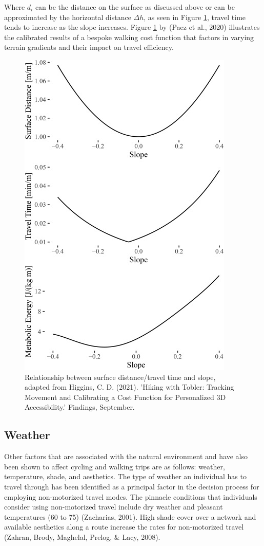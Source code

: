 \documentclass[
11pt, %
oneside, %
english, %
singlespacing, %
]{macthesis} %
\begin{document}
Where \(d_i\) can be the distance on the surface as discussed above or can be approximated by the horizontal distance \(\Delta h\), as seen in Figure \ref{fig:ch02-plot-fig-03}, travel time tends to increase as the slope increases. Figure \ref{fig:ch02-plot-fig-03} by (Paez et al., 2020) illustrates the calibrated results of a bespoke walking cost function that factors in varying terrain gradients and their impact on travel efficiency.

\begin{figure}

{\centering \includegraphics[width=0.5\linewidth]{figure/ch02-Fig-03} 

}

\caption{Relationship between surface distance/travel time and slope, adapted from Higgins, C. D. (2021). 'Hiking with Tobler: Tracking Movement and Calibrating a Cost Function for Personalized 3D Accessibility.' Findings, September.}\label{fig:ch02-plot-fig-03}
\end{figure}

\newpage

\subsection{Weather}\label{weather}

Other factors that are associated with the natural environment and have also been shown to affect cycling and walking trips are as follows: weather, temperature, shade, and aesthetics. The type of weather an individual has to travel through has been identified as a principal factor in the decision process for employing non-motorized travel modes. The pinnacle conditions that individuals consider using non-motorized travel include dry weather and pleasant temperatures (60 to 75) (Zacharias, 2001). High shade cover over a network and available aesthetics along a route increase the rates for non-motorized travel (Zahran, Brody, Maghelal, Prelog, \& Lacy, 2008).
\end{document}
